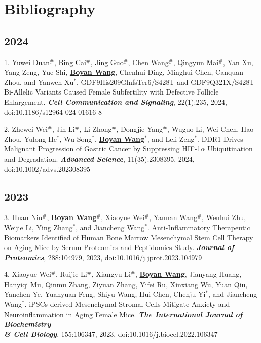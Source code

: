 \documentclass{article}
\begin{document}
\section*{Bibliography}

\subsection*{2024}

1. Yuwei Duan$^{\#}$, Bing Cai$^{\#}$, Jing Guo$^{\#}$, Chen Wang$^{\#}$, Qingyun Mai$^{\#}$, Yan Xu, Yang Zeng, Yue Shi, \underline{\textbf{Boyan Wang}}, Chenhui Ding, Minghui Chen, Canquan Zhou, and Yanwen Xu$^{*}$. GDF9His209GlnfsTer6/S428T and GDF9Q321X/S428T Bi-Allelic Variants Caused Female Subfertility with Defective Follicle Enlargement. \textbf{\textit{Cell Communication and Signaling}}, 22(1):235, 2024, doi:10.1186/s12964-024-01616-8

2. Zhewei Wei$^{\#}$, Jin Li$^{\#}$, Li Zhong$^{\#}$, Dongjie Yang$^{\#}$, Wuguo Li, Wei Chen, Hao Zhou, Yulong He$^{*}$, Wu Song$^{*}$, \underline{\textbf{Boyan Wang}}$^{*}$, and Leli Zeng$^{*}$. DDR1 Drives Malignant Progression of Gastric Cancer by Suppressing HIF-1$\alpha$ Ubiquitination and Degradation. \textbf{\textit{Advanced Science}}, 11(35):2308395, 2024, doi:10.1002/advs.202308395

\subsection*{2023}

3. Huan Niu$^{\#}$, \underline{\textbf{Boyan Wang}}$^{\#}$, Xiaoyue Wei$^{\#}$, Yannan Wang$^{\#}$, Wenhui Zhu, Weijie Li, Ying Zhang$^{*}$, and Jiancheng Wang$^{*}$. Anti-Inflammatory Therapeutic Biomarkers Identified of Human Bone Marrow Mesenchymal Stem Cell Therapy on Aging Mice by Serum Proteomics and Peptidomics Study. \textbf{\textit{Journal of Proteomics}}, 288:104979, 2023, doi:10.1016/j.jprot.2023.104979

4. Xiaoyue Wei$^{\#}$, Ruijie Li$^{\#}$, Xiangyu Li$^{\#}$, \underline{\textbf{Boyan Wang}}, Jianyang Huang, Hanyiqi Mu, Qinmu Zhang, Ziyuan Zhang, Yifei Ru, Xinxiang Wu, Yuan Qiu, Yanchen Ye, Yuanyuan Feng, Shiyu Wang, Hui Chen, Chenju Yi$^{*}$, and Jiancheng Wang$^{*}$. iPSCs-derived Mesenchymal Stromal Cells Mitigate Anxiety and Neuroinflammation in Aging Female Mice. \textbf{\textit{The International Journal of Biochemistry \\& Cell Biology}}, 155:106347, 2023, doi:10.1016/j.biocel.2022.106347
\end{document}
